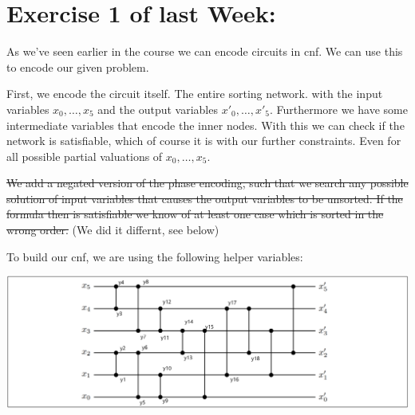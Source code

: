 \documentclass{base}
\begin{document}



\section*{Exercise 1 of last Week:}

As we've seen earlier in the course we can encode circuits in cnf.
We can use this to encode our given problem.

First, we encode the circuit itself. The entire sorting network. with the input variables $x_0,\dots,x_5$ and the output variables $x'_0,\dots,x'_5$. Furthermore we have some intermediate variables that encode the inner nodes.
With this we can check if the network is satisfiable, which of course it is with our further constraints. Even for all possible partial valuations of $x_0,\dots,x_5$.

\sout{We add a negated version of the phase encoding, such that we search any possible solution of input variables that causes the output variables to be unsorted. If the formula then is satisfiable we know of at least one case which is sorted in the wrong order.} (We did it differnt, see below)

To build our cnf, we are using the following helper variables:
\begin{center}
	\includegraphics[width=\linewidth]{sorting_network.png}
\end{center}
\end{document}
